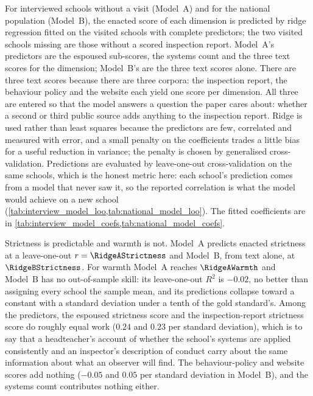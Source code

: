 For interviewed schools without a visit (Model~A) and for the national
population (Model~B), the enacted score of each dimension is predicted by
ridge regression fitted on the \RidgeTrainN{} visited schools with complete
predictors; the two visited schools missing are those without a scored
inspection report. Model~A's predictors are the espoused sub-scores, the
systems count and the three text scores for the dimension; Model~B's are the
three text scores alone. There are three text scores because there are three
corpora: the inspection report, the behaviour policy and the website each
yield one score per dimension. All three are entered so that the model
answers a question the paper cares about: whether a second or third public
source adds anything to the inspection report. Ridge is used rather than
least squares because the predictors are few, correlated and measured with
error, and a small penalty on the coefficients trades a little bias for a
useful reduction in variance; the penalty is chosen by generalised
cross-validation. Predictions are evaluated by leave-one-out
cross-validation on the same schools, which is the honest metric here: each
school's prediction comes from a model that never saw it, so the reported
correlation is what the model would achieve on a new school
(\cref{tab:interview_model_loo,tab:national_model_loo}). The fitted
coefficients are in \cref{tab:interview_model_coefs,tab:national_model_coefs}.

Strictness is predictable and warmth is not. Model~A predicts enacted
strictness at a leave-one-out $r = \RidgeAStrictness$ and Model~B, from text
alone, at $\RidgeBStrictness$. For warmth Model~A reaches $\RidgeAWarmth$ and
Model~B has no out-of-sample skill: its leave-one-out $R^2$ is $-0.02$, no
better than assigning every school the sample mean, and its predictions
collapse toward a constant with a standard deviation under a tenth of the
gold standard's. Among the predictors, the espoused strictness score and the
inspection-report strictness score do roughly equal work ($0.24$ and $0.23$
per standard deviation), which is to say that a headteacher's account of
whether the school's systems are applied consistently and an inspector's
description of conduct carry about the same information about what an
observer will find. The behaviour-policy and website scores add nothing
($-0.05$ and $0.05$ per standard deviation in Model~B), and the systems count
contributes nothing either.




